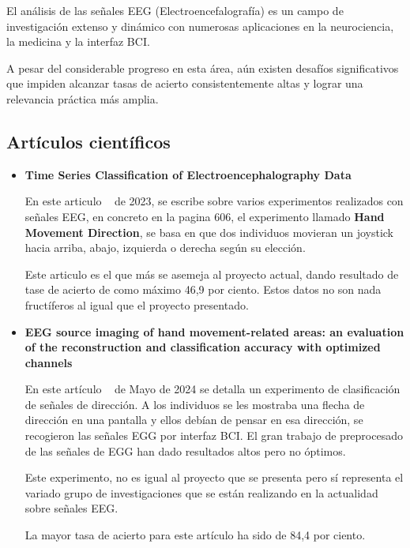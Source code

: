 

El análisis de las señales EEG (Electroencefalografía) es un campo de investigación extenso y dinámico con numerosas aplicaciones en la neurociencia, la medicina y la interfaz BCI.

A pesar del considerable progreso en esta área, aún existen desafíos significativos que impiden alcanzar tasas de acierto consistentemente altas y lograr una relevancia práctica más amplia.

\subsection{Artículos científicos}

\begin{itemize}

\item
\textbf{Time Series Classification of Electroencephalography Data}

En este articulo ~\cite{Conference:paper} de 2023, se escribe sobre varios experimentos realizados con señales EEG, en concreto en la pagina 606, el experimento llamado \textbf{Hand Movement Direction}, se basa en que dos individuos movieran un joystick hacia arriba, abajo, izquierda o derecha según su elección.

Este articulo es el que más se asemeja al proyecto actual, dando resultado de tase de acierto de como máximo 46,9 por ciento. Estos datos no son nada fructíferos al igual que el proyecto presentado.

\item
\textbf{EEG source imaging of hand movement-related areas: an evaluation of the reconstruction and classification accuracy with optimized channels}

En este artículo ~\cite{Article:springer} de Mayo de 2024 se detalla un experimento de clasificación de señales de dirección. A los individuos se les mostraba una flecha de dirección en una pantalla y ellos debían de pensar en esa dirección, se recogieron las señales EGG por interfaz BCI. El gran trabajo de preprocesado de las señales de EGG han dado resultados altos pero no óptimos.

Este experimento, no es igual al proyecto que se presenta pero sí representa el variado grupo de investigaciones que se están realizando en la actualidad sobre señales EEG.

La mayor tasa de acierto para este artículo ha sido de 84,4 por ciento.


\end{itemize}


